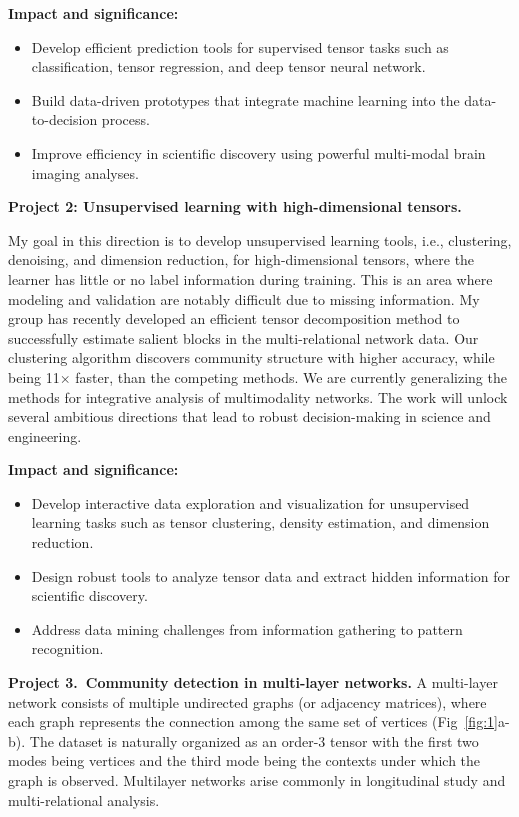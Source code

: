 \documentclass[11pt]{article}
\DeclareRobustCommand{\mybox}[2][gray!20]{%
\begin{tcolorbox}[   %
        breakable,
        left=0pt,
        right=0pt,
        top=0pt,
        bottom=0pt,
        colback=#1,
        colframe=#1,
        width=\dimexpr\textwidth\relax, 
        enlarge left by=0mm,
        boxsep=5pt,
        arc=0pt,outer arc=0pt,
        ]
        #2
\end{tcolorbox}
}
\theoremstyle{plain}
\theoremstyle{definition}
\begin{document}
\mybox[gray!20]{{\bf Impact and significance:} 
\begin{itemize}[leftmargin=*]
\item Develop efficient prediction tools for supervised tensor tasks such as classification, tensor regression, and deep tensor neural network.
\item  Build data-driven prototypes that integrate machine learning into the data-to-decision process. 
\item  Improve efficiency in scientific discovery using powerful multi-modal brain imaging analyses.
\end{itemize}
}

{\bf Project 2: Unsupervised learning with high-dimensional tensors.} 

My goal in this direction is to develop unsupervised learning tools, i.e., clustering, denoising, and dimension reduction, for high-dimensional tensors, where the learner has little or no label information during training. This is an area where modeling and validation are notably difficult due to missing information. My group has recently developed an efficient tensor decomposition method to successfully estimate salient blocks in the multi-relational network data. Our clustering algorithm discovers community structure with higher accuracy, while being 11$\times$ faster, than the competing methods. We are currently generalizing the methods for integrative analysis of multimodality networks. The work will unlock several ambitious directions that lead to robust decision-making in science and engineering.
\mybox[gray!20]{{\bf Impact and significance:} 
\begin{itemize}[leftmargin=*]
\item Develop interactive data exploration and visualization for unsupervised learning tasks such as tensor clustering, density estimation, and dimension reduction.
\item Design robust tools to analyze tensor data and extract hidden information for scientific discovery. 
\item Address data mining challenges from information gathering to pattern recognition.
\end{itemize}
}


{\bf Project 3.\  Community detection in multi-layer networks.}
A multi-layer network consists of multiple undirected graphs (or adjacency matrices), where each graph represents the connection among the same set of vertices (Fig~\ref{fig:1}a-b). The dataset is naturally organized as an order-3 tensor with the first two modes being vertices and the third mode being the contexts under which the graph is observed. Multilayer networks arise commonly in longitudinal study and multi-relational analysis. 
\end{document}
